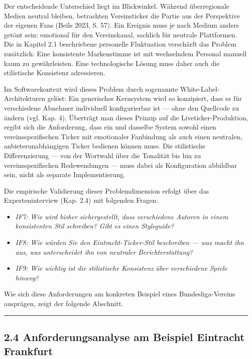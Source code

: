 Der entscheidende Unterschied liegt im Blickwinkel. Während
überregionale Medien neutral bleiben, betrachten Vereinsticker die
Partie aus der Perspektive der eigenen Fans (Beils 2023, S. 57). Ein
Ereignis muss je nach Medium anders getönt sein: emotional für den
Vereinskanal, sachlich für neutrale Plattformen. Die in Kapitel 2.1
beschriebene personelle Fluktuation verschärft das Problem zusätzlich:
Eine konsistente Markenstimme ist mit wechselndem Personal manuell kaum
zu gewährleisten. Eine technologische Lösung muss daher auch die
stilistische Konsistenz adressieren.

Im Softwarekontext wird dieses Problem durch sogenannte
White-Label-Architekturen gelöst: Ein generisches Kernsystem wird so
konzipiert, dass es für verschiedene Abnehmer individuell konfigurierbar
ist --- ohne den Quellcode zu ändern (vgl. Kap. 4). Überträgt man dieses
Prinzip auf die Liveticker-Produktion, ergibt sich die Anforderung, dass
ein und dasselbe System sowohl einen vereinsspezifischen Ticker mit
emotionaler Fanbindung als auch einen neutralen, anbieterunabhängigen
Ticker bedienen können muss. Die stilistische Differenzierung --- von
der Wortwahl über die Tonalität bis hin zu vereinsspezifischen
Redewendungen --- muss dabei als Konfiguration abbildbar sein, nicht als
separate Implementierung.

Die empirische Validierung dieser Problemdimension erfolgt über das
Experteninterview (Kap. 2.4) mit folgenden Fragen:

\begin{itemize}
\tightlist
\item
  \emph{IF7: Wie wird bisher sichergestellt, dass verschiedene Autoren
  in einem konsistenten Stil schreiben? Gibt es einen Styleguide?}
\item
  \emph{IF8: Wie würden Sie den Eintracht-Ticker-Stil beschreiben ---
  was macht ihn aus, was unterscheidet ihn von neutraler
  Berichterstattung?}
\item
  \emph{IF9: Wie wichtig ist die stilistische Konsistenz über
  verschiedene Spiele hinweg?}
\end{itemize}

Wie sich diese Anforderungen am konkreten Beispiel eines
Bundesliga-Vereins ausprägen, zeigt der folgende Abschnitt.

\begin{center}\rule{0.5\linewidth}{0.5pt}\end{center}

\subsection{2.4 Anforderungsanalyse am Beispiel Eintracht
Frankfurt}\label{anforderungsanalyse-am-beispiel-eintracht-frankfurt}

